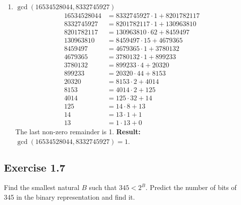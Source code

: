 \begin{enumerate}
    \item \textbf{$\gcd(16534528044, 8332745927)$}
    \begin{align*}
        16534528044 &= 8332745927 \cdot 1 + 8201782117 \\
        8332745927 &= 8201782117 \cdot 1 + 130963810 \\
        8201782117 &= 130963810 \cdot 62 + 8459497 \\
        130963810 &= 8459497 \cdot 15 + 4679365 \\
        8459497 &= 4679365 \cdot 1 + 3780132 \\
        4679365 &= 3780132 \cdot 1 + 899233 \\
        3780132 &= 899233 \cdot 4 + 20320 \\
        899233 &= 20320 \cdot 44 + 8153 \\
        20320 &= 8153 \cdot 2 + 4014 \\
        8153 &= 4014 \cdot 2 + 125 \\
        4014 &= 125 \cdot 32 + 14 \\
        125 &= 14 \cdot 8 + 13 \\
        14 &= 13 \cdot 1 + 1 \\
        13 &= 1 \cdot 13 + 0
    \end{align*}
    The last non-zero remainder is 1.
    \textbf{Result:} $\gcd(16534528044, 8332745927) = 1$.
\end{enumerate}
\newpage
\subsection*{Exercise 1.7}
Find the smallest natural $B$ such that $345 < 2^B$. Predict the number of bits of 345 in the binary representation and find it.

